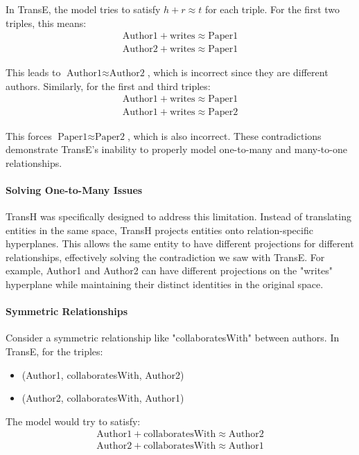 \documentclass[10pt,a4paper]{article}
\begin{document}
In TransE, the model tries to satisfy $h + r \approx t$ for each triple. For the first two triples, this means:
\begin{align*}
    \text{Author1} + \text{writes} \approx \text{Paper1} \\
    \text{Author2} + \text{writes} \approx \text{Paper1}
\end{align*}

This leads to $\text{Author1} \approx \text{Author2}$, which is incorrect since they are different authors. Similarly, for the first and third triples:
\begin{align*}
    \text{Author1} + \text{writes} \approx \text{Paper1} \\
    \text{Author1} + \text{writes} \approx \text{Paper2}
\end{align*}

This forces $\text{Paper1} \approx \text{Paper2}$, which is also incorrect. These contradictions demonstrate TransE's inability to properly model one-to-many and many-to-one relationships.

\paragraph{Solving One-to-Many Issues}
TransH was specifically designed to address this limitation. Instead of translating entities in the same space, TransH projects entities onto relation-specific hyperplanes. This allows the same entity to have different projections for different relationships, effectively solving the contradiction we saw with TransE. For example, Author1 and Author2 can have different projections on the "writes" hyperplane while maintaining their distinct identities in the original space.

\paragraph{Symmetric Relationships}
Consider a symmetric relationship like "collaboratesWith" between authors. In TransE, for the triples:
\begin{itemize}
    \item (Author1, collaboratesWith, Author2)
    \item (Author2, collaboratesWith, Author1)
\end{itemize}

The model would try to satisfy:
\begin{align*}
    \text{Author1} + \text{collaboratesWith} \approx \text{Author2} \\
    \text{Author2} + \text{collaboratesWith} \approx \text{Author1}
\end{align*}
\end{document}
